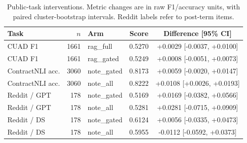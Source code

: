 \begin{table}[htbp]\centering\small
\caption{Public-task interventions. Metric changes are in raw F1/accuracy units, with paired cluster-bootstrap intervals. Reddit labels refer to post-term items.}
\begin{tabular}{@{}lr lcc@{}}\toprule
Task & $n$ & Arm & Score & Difference [95\% CI]\\\midrule
CUAD F1 & 1661 & rag\_full & 0.5270 & +0.0029 [-0.0037, +0.0100]\\
CUAD F1 & 1661 & rag\_gated & 0.5249 & +0.0008 [-0.0051, +0.0073]\\
ContractNLI acc. & 3060 & note\_gated & 0.8173 & +0.0059 [-0.0020, +0.0147]\\
ContractNLI acc. & 3060 & note\_all & 0.8222 & +0.0108 [+0.0026, +0.0193]\\
Reddit / GPT & 178 & note\_gated & 0.5169 & +0.0169 [-0.0382, +0.0566]\\
Reddit / GPT & 178 & note\_all & 0.5281 & +0.0281 [-0.0715, +0.0909]\\
Reddit / DS & 178 & note\_gated & 0.6124 & +0.0056 [-0.0335, +0.0473]\\
Reddit / DS & 178 & note\_all & 0.5955 & -0.0112 [-0.0592, +0.0373]\\
\bottomrule\end{tabular}\end{table}